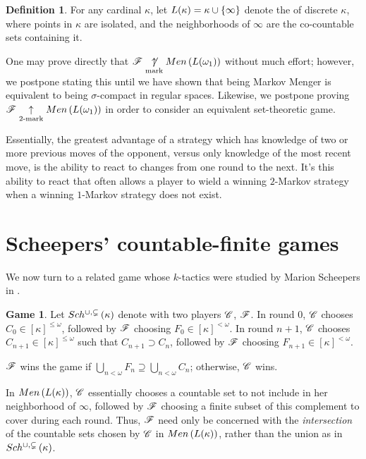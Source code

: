 \documentclass{amsart}
\theoremstyle{definition}
\newtheorem{definition}[theorem]{Definition}
\newtheorem{game}[theorem]{Game}
\begin{document}
\begin{definition}
  For any cardinal \(\kappa\), let \(L(\kappa)=\kappa\cup\{\infty\}\) denote
  the  of discrete \(\kappa\), where points in
  \(\kappa\) are isolated, and the neighborhoods of \(\infty\) are the co-countable
  sets containing it.
\end{definition}

One may prove directly that
  \(\mathscr{F} \underset{\text{mark}}{\not\uparrow} Men\left({L(\omega_1)}\right)\)
without much effort; however, we postpone stating this until we have
shown that being Markov Menger is equivalent to being \(\sigma\)-compact
in regular spaces. Likewise, we postpone proving
  \(\mathscr{F} \underset{2\text{-mark}}{\uparrow} Men\left({L(\omega_1)}\right)\)
in order to consider an equivalent set-theoretic game.

Essentially,
the greatest advantage of a strategy which has knowledge of two or more previous
moves of the opponent, versus only knowledge of the most recent move, is the
ability to react to changes from one round to the next. It's this ability to
react that often allows a player to wield a winning \(2\)-Markov strategy when
a winning \(1\)-Markov strategy does not exist.

\section{Scheepers' countable-finite games}

We now turn to a related game whose \(k\)-tactics were studied by Marion
Scheepers in \cite{MR1129143}.

\begin{game}
  Let \(Sch^{\cup,\subsetneq}\left({\kappa}\right)\) denote
  with two players \(\mathscr{C}\), \(\mathscr{F}\). In round \(0\), \(\mathscr{C}\) chooses
  \(C_0\in[\kappa]^{\leq\omega}\), followed by \(\mathscr{F}\) choosing
  \(F_0\in[\kappa]^{<\omega}\). In round \(n+1\), \(\mathscr{C}\) chooses
  \(C_{n+1}\in[\kappa]^{\leq\omega}\) such that \(C_{n+1}\supset C_n\), followed
  by \(\mathscr{F}\) choosing \(F_{n+1}\in[\kappa]^{<\omega}\).

  \(\mathscr{F}\) wins the game if
  \(\bigcup_{n<\omega} F_n\supseteq\bigcup_{n<\omega} C_n\); otherwise,
  \(\mathscr{C}\) wins.
\end{game}

In \(Men\left({L(\kappa)}\right)\), \(\mathscr{C}\) essentially chooses a countable set
to not include in her neighborhood of \(\infty\), followed by \(\mathscr{F}\) choosing
a finite subset of this complement to cover during each round. Thus,
\(\mathscr{F}\) need only be concerned with the \textit{intersection} of the
countable sets chosen by \(\mathscr{C}\) in \(Men\left({L(\kappa)}\right)\), rather
than the union as in \(Sch^{\cup,\subsetneq}\left({\kappa}\right)\).
\end{document}
